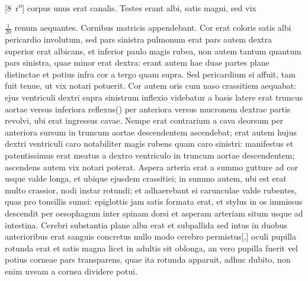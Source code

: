 [8~r\textsuperscript{o}]
corpus unus erat canalis.
Testes erant albi, satis magni, sed vix \rule[-4mm]{0mm}{10mm}$\displaystyle\frac{1}{20}$ renum aequantes.
Cornibus matricis appendebant.
\pend%
\newpage
\pstart%
Cor erat coloris
satis albi pericardio involutum, sed pars sinistra pulmonum erat
pars autem dextra superior erat albicans, et inferior paulo magis rubea, non autem tantum quantum pars sinistra, quae minor erat dextra: erant autem hae duae partes plane distinctae et potius infra cor a tergo quam supra.
Sed pericardium si affuit, tam fuit tenue, ut vix notari potuerit.
Cor autem oris cum naso crassitiem aequabat: ejus ventriculi dextri supra sinistrum inflexio videbatur a basis latere
erat truncus aortae versus inferiora reflexus\phantom(\hspace{-1.2mm}) per anteriora versus mucronem dextrae partis revolvi, ubi erat ingressus cavae.
Nempe erat contrarium
a cava deorsum per anteriora sursum in truncum aortae descendentem ascendebat; erat autem hujus dextri ventriculi caro notabiliter magis rubens quam caro sinistri: manifestus et patentissimus erat meatus a dextro ventriculo in truncum aortae descendentem; ascendens autem vix notari poterat.
Aspera arteria erat a summo gutture ad cor usque valde longa, et ubique ejusdem crassitiei; in summo autem, ubi est
erat multo crassior, nodi instar rotundi; et adhaerebant ei carunculae valde rubentes, quas pro tonsillis sumsi: epiglottis jam satis formata erat, et stylus in os immissus descendit per oesophagum inter spinam dorsi et asperam arteriam situm usque ad intestina. Cerebri substantia plane alba erat et subpallida sed intus in duobus anterioribus erat sanguis concretus nullo modo cerebro permistus[,] oculi pupilla rotunda erat et satis magna licet in adultis sit oblonga, an vero pupilla fuerit vel potius corneae pars transparens, quae ita rotunda apparuit, adhuc dubito, non enim uveam a cornea dividere potui.

